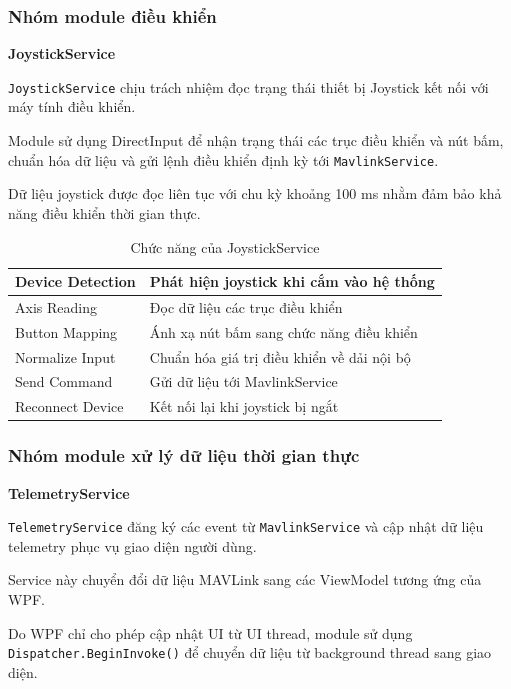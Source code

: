\documentclass[../DoAn.tex]{subfiles}
\begin{document}
\subsubsection{Nhóm module điều khiển}

\subsubsubsection\textbf{JoystickService}

\texttt{JoystickService} chịu trách nhiệm đọc trạng thái thiết bị
Joystick kết nối với máy tính điều khiển.

Module sử dụng DirectInput để nhận trạng thái các trục điều khiển và nút
bấm, chuẩn hóa dữ liệu và gửi lệnh điều khiển định kỳ tới
\texttt{MavlinkService}.

Dữ liệu joystick được đọc liên tục với chu kỳ khoảng 100 ms nhằm đảm bảo
khả năng điều khiển thời gian thực.

\begin{table}[H]
\centering
\begin{tabular}{|l|p{9cm}|}
\hline
Device Detection &
Phát hiện joystick khi cắm vào hệ thống\\
\hline
Axis Reading &
Đọc dữ liệu các trục điều khiển\\
\hline
Button Mapping &
Ánh xạ nút bấm sang chức năng điều khiển\\
\hline
Normalize Input &
Chuẩn hóa giá trị điều khiển về dải nội bộ\\
\hline
Send Command &
Gửi dữ liệu tới MavlinkService\\
\hline
Reconnect Device &
Kết nối lại khi joystick bị ngắt\\
\hline
\end{tabular}
\caption{Chức năng của JoystickService}
\end{table}

\subsubsection{Nhóm module xử lý dữ liệu thời gian thực}

\subsubsubsection\textbf{TelemetryService}

\texttt{TelemetryService} đăng ký các event từ
\texttt{MavlinkService} và cập nhật dữ liệu telemetry phục vụ giao diện
người dùng.

Service này chuyển đổi dữ liệu MAVLink sang các ViewModel tương ứng của
WPF.

Do WPF chỉ cho phép cập nhật UI từ UI thread, module sử dụng
\texttt{Dispatcher.BeginInvoke()} để chuyển dữ liệu từ background thread
sang giao diện.
\end{document}
